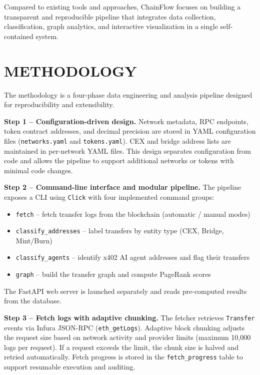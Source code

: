 \documentclass[a4paper,12pt]{report}
\begin{document}
Compared to existing tools and approaches, ChainFlow focuses on building a transparent and
reproducible pipeline that integrates data collection, classification, graph analytics, and
interactive visualization in a single self-contained system.

\chapter{METHODOLOGY}

The methodology is a four-phase data engineering and analysis pipeline designed for
reproducibility and extensibility.

\textbf{Step 1 -- Configuration-driven design.}
Network metadata, RPC endpoints, token contract addresses, and decimal precision are stored in
YAML configuration files (\texttt{networks.yaml} and \texttt{tokens.yaml}). CEX and bridge
address lists are maintained in per-network YAML files. This design separates configuration from
code and allows the pipeline to support additional networks or tokens with minimal code changes.

\textbf{Step 2 -- Command-line interface and modular pipeline.}
The pipeline exposes a CLI using \texttt{Click} with four implemented command groups:
\begin{itemize}
    \item \texttt{fetch} -- fetch transfer logs from the blockchain (automatic / manual modes)
    \item \texttt{classify\_addresses} -- label transfers by entity type (CEX, Bridge, Mint/Burn)
    \item \texttt{classify\_agents} -- identify x402 AI agent addresses and flag their transfers
    \item \texttt{graph} -- build the transfer graph and compute PageRank scores
\end{itemize}
The FastAPI web server is launched separately and reads pre-computed results from the database.

\textbf{Step 3 -- Fetch logs with adaptive chunking.}
The fetcher retrieves \texttt{Transfer} events via Infura JSON-RPC (\texttt{eth\_getLogs}).
Adaptive block chunking adjusts the request size based on network activity and provider limits
(maximum 10,000 logs per request). If a request exceeds the limit, the chunk size is halved and
retried automatically. Fetch progress is stored in the \texttt{fetch\_progress} table to support
resumable execution and auditing.
\end{document}
